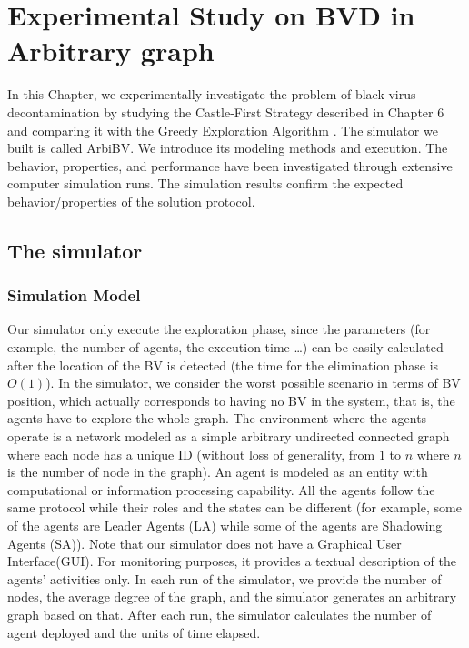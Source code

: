
\chapter {Experimental Study on BVD in Arbitrary graph}
\label{Experiments}
 In this Chapter, we experimentally investigate the problem of black virus decontamination by studying the {\sc Castle-First} Strategy described in Chapter 6 and comparing it with the  {\sc Greedy} Exploration Algorithm \cite{cai}. 
The simulator we built is called {\sc ArbiBV}. We introduce its modeling methods and execution. The behavior, properties, and performance have been investigated through extensive computer simulation runs. The simulation results confirm the expected behavior/properties of the solution protocol.
\section{The simulator}
\subsection{Simulation Model}
Our simulator only execute    the exploration phase, since the parameters (for example, the number of agents, the execution time \ldots) can be easily calculated after the location of the BV is detected (the time for the elimination phase is $O(1)$). In the simulator, we consider the worst possible scenario in terms of BV position, which actually corresponds to having no BV in the system, that is,   the agents have to explore the whole graph. The environment where the agents operate is a network modeled as a simple arbitrary undirected connected graph where each node has a unique ID (without loss of generality, from $1$ to $n$ where $n$ is the number of node in the graph). An agent is modeled as an entity with computational or information processing capability. All the agents follow the same protocol while their roles and the states can be different (for example, some of the agents are Leader Agents (LA) while some of the agents are Shadowing Agents (SA)). Note that our simulator does not have a Graphical User Interface(GUI). For monitoring purposes,  it provides a textual  description of the agents' activities only.   In each run of the simulator, we provide the number of nodes, the average degree of the graph, and the simulator generates an arbitrary graph based on that. After each run, the simulator calculates the number of agent deployed and the units of time elapsed.

